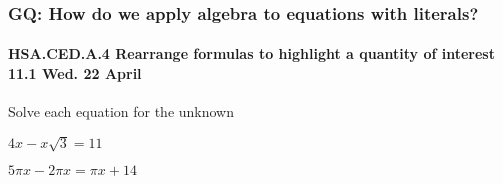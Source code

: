 \documentclass{beamer}
\begin{document}
\frame
{
  \frametitle{GQ: How do we apply algebra to equations with literals?}
  \framesubtitle{HSA.CED.A.4 Rearrange formulas to highlight a quantity of interest \hfill \alert{11.1 Wed. 22 April}}
  \Large{
  Solve each equation for the unknown
  
  \begin{enumerate}%
    \begin{multicols}{2}
      \item $4x-x\sqrt{3}=11$
      \item $5\pi x-2 \pi x= \pi x +14$
    \end{multicols}
    \end{enumerate} \vspace{7cm}
}}
\end{document}
